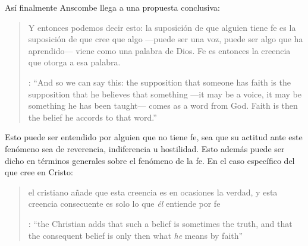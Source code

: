 Así finalmente Anscombe llega a una propuesta conclusiva: \blockquote[{\cite[119--120]{anscombe1981erp:faith}}: \enquote{And so we can say this: the supposition that someone has faith is the supposition that he believes that something ---it may be a voice, it may be something he has been taught--- comes as a word from God. Faith is then the belief he accords to that word.}]{Y entonces podemos decir esto: la suposición de que alguien tiene fe es la suposición de que cree que algo ---puede ser una voz, puede ser algo que ha aprendido--- viene como una palabra de Dios. Fe es entonces la creencia que otorga a esa palabra.} Esto puede ser entendido por alguien que no tiene fe, sea que su actitud ante este fenómeno sea de reverencia, indiferencia u hostilidad. Esto además puede ser dicho en términos generales sobre el fenómeno de la fe. En el caso específico del que cree en Cristo: \blockquote[{\cite[120]{anscombe1981erp:faith}}: \enquote{the Christian adds that such a belief is sometimes the truth, and that the consequent belief is only then what \emph{he} means by faith}]{el cristiano añade que esta creencia es en ocasiones la verdad, y esta creencia consecuente es solo lo que \emph{él} entiende por fe}.
